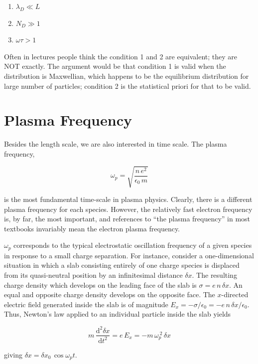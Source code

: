 \documentclass[
  notoc %
]{tufte-book}
\providecommand{\tightlist}{%
  \setlength{\itemsep}{0pt}\setlength{\parskip}{0pt}
}
\begin{document}
\begin{enumerate}
\def\labelenumi{\arabic{enumi}.}
\tightlist
\item
  \(\lambda_D \ll L\)
\item
  \(N_D \gg 1\)
\item
  \(\omega\tau > 1\)
\end{enumerate}

Often in lectures people think the condition 1 and 2 are equivalent;
they are NOT exactly. The argument would be that condition 1 is valid
when the distribution is Maxwellian, which happens to be the equilibrium
distribution for large number of particles; condition 2 is the
statistical priori for that to be valid.

\hypertarget{plasma-frequency}{%
\section{Plasma Frequency}\label{plasma-frequency}}

Besides the length scale, we are also interested in time scale. The
plasma frequency,

\[
\omega_p = \sqrt{\frac{n\,e^2}{\epsilon_0\,m}}
\]

is the most fundamental time-scale in plasma physics. Clearly, there is
a different plasma frequency for each species. However, the relatively
fast electron frequency is, by far, the most important, and references
to ``the plasma frequency'' in most textbooks invariably mean the
electron plasma frequency.

\(\omega_p\) corresponds to the typical electrostatic oscillation
frequency of a given species in response to a small charge separation.
For instance, consider a one-dimensional situation in which a slab
consisting entirely of one charge species is displaced from its
quasi-neutral position by an infinitesimal distance \(\delta x\). The
resulting charge density which develops on the leading face of the slab
is \(\sigma=e\,n\,\delta x\). An equal and opposite charge density
develops on the opposite face. The \(x\)-directed electric field
generated inside the slab is of magnitude
\(E_x= -\sigma/\epsilon_0 =- e\,n\,\delta x/\epsilon_0\). Thus, Newton's
law applied to an individual particle inside the slab yields

\[
m\,\frac{\mathrm{d}^2 \delta x}{\mathrm{d}t^2} = e\,E_x = -m\,\omega_p^{~2}\,\delta x
\]

giving \(\delta x = \delta x_0\,\cos\omega_p t\).
\end{document}
